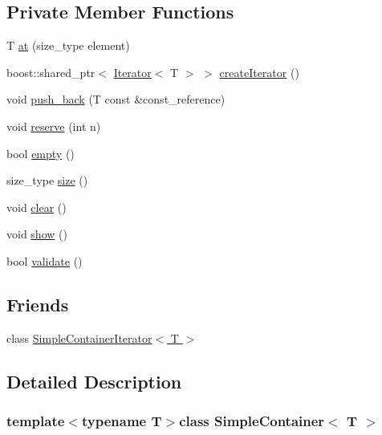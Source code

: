 \subsection*{Private Member Functions}
\begin{DoxyCompactItemize}
\item 
T \hyperlink{class_simple_container_a2e8f56f3af1e0ffb1fcd54d05d82c477}{at} (size\_\-type element)
\item 
boost::shared\_\-ptr$<$ \hyperlink{class_iterator}{Iterator}$<$ T $>$ $>$ \hyperlink{class_simple_container_a4e46f5cb32231deaf9aa9bb7f871d09e}{createIterator} ()
\item 
void \hyperlink{class_simple_container_a53466966297b3f0a707e025b3721004a}{push\_\-back} (T const \&const\_\-reference)
\item 
void \hyperlink{class_simple_container_a4bca44e6a9cef9d57627218c0a180d8a}{reserve} (int n)
\item 
bool \hyperlink{class_simple_container_ac2966f33796f69c290a84361a578ed08}{empty} ()
\item 
size\_\-type \hyperlink{class_simple_container_a2fdb3580e1728e6e2ba6ef77c0bce63e}{size} ()
\item 
void \hyperlink{class_simple_container_ae3ee6cb18f1dd33ab5de4f9854ce245f}{clear} ()
\item 
void \hyperlink{class_simple_container_af4d591e2c3a44ae016e01e3d07d1e9ac}{show} ()
\item 
bool \hyperlink{class_simple_container_ac7cae8eaac2dc0a69138b65f679bd16a}{validate} ()
\end{DoxyCompactItemize}
\subsection*{Friends}
\begin{DoxyCompactItemize}
\item 
class \hyperlink{class_simple_container_a9abe836547cca50b94869af58a0901f7}{SimpleContainerIterator$<$ T $>$}
\end{DoxyCompactItemize}


\subsection{Detailed Description}
\subsubsection*{template$<$typename T$>$class SimpleContainer$<$ T $>$}

